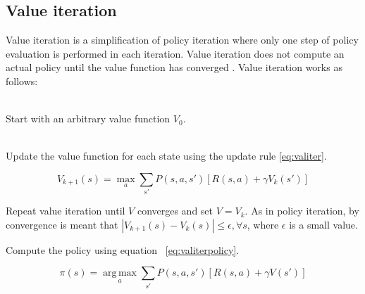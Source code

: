 \subsection{Value iteration}
\label{sec:valueiteration}

Value iteration is a simplification of policy iteration where only one step of
policy evaluation is performed in each iteration. Value iteration does not compute an actual
policy until the value function has converged \parencite{barto1998reinforcement}. Value iteration works as follows:

\begin{description}
\item[Initialization] \hfill \\
    Start with an arbitrary value function $V_0$.
\item[Value iteration] \hfill \\
    Update the value function for each state using the update rule \eqref{eq:valiter}.

\begin{equation} \label{eq:valiter}
V_{k+1}(s) = \max_a \sum_{s'}{P(s, a, s') \left[R(s, a) + \gamma V_k(s')\right]}
\end{equation}

\item Repeat value iteration until $V$ converges and set $V = V_k$. As in policy iteration, by
  convergence is meant that $|V_{k+1}(s) - V_{k}(s)| \leq \epsilon, \forall s$, where
  $\epsilon$ is a small value. 

\item Compute the policy using equation ~\eqref{eq:valiterpolicy}.

\begin{equation} \label{eq:valiterpolicy}
\pi(s) = \operatorname*{arg\,max}_a \sum_{s'}{P(s, a, s') \left[R(s, a) + \gamma V(s')\right]}
\end{equation}

\end{description}
